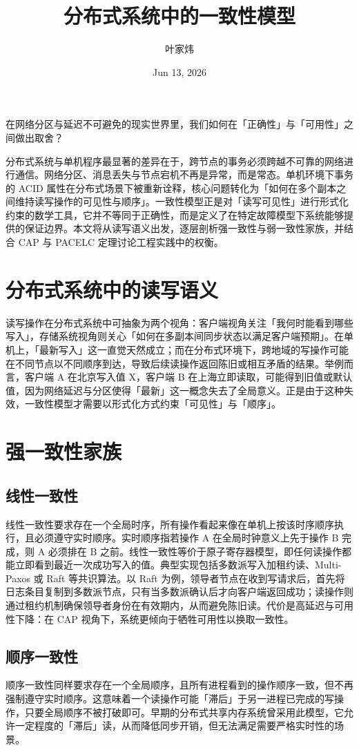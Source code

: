 \title{分布式系统中的一致性模型}
\author{叶家炜}
\date{Jun 13, 2026}
\maketitle
在网络分区与延迟不可避免的现实世界里，我们如何在「正确性」与「可用性」之间做出取舍？\par
分布式系统与单机程序最显著的差异在于，跨节点的事务必须跨越不可靠的网络进行通信。网络分区、消息丢失与节点宕机不再是异常，而是常态。单机环境下事务的 ACID 属性在分布式场景下被重新诠释，核心问题转化为「如何在多个副本之间维持读写操作的可见性与顺序」。一致性模型正是对「读写可见性」进行形式化约束的数学工具，它并不等同于正确性，而是定义了在特定故障模型下系统能够提供的保证边界。本文将从读写语义出发，逐层剖析强一致性与弱一致性家族，并结合 CAP 与 PACELC 定理讨论工程实践中的权衡。\par
\chapter{分布式系统中的读写语义}
读写操作在分布式系统中可抽象为两个视角：客户端视角关注「我何时能看到哪些写入」，存储系统视角则关心「如何在多副本间同步状态以满足客户端预期」。在单机上，「最新写入」这一直觉天然成立；而在分布式环境下，跨地域的写操作可能在不同节点以不同顺序到达，导致后续读操作返回陈旧或相互矛盾的结果。举例而言，客户端 A 在北京写入值 X，客户端 B 在上海立即读取，可能得到旧值或默认值，因为网络延迟与分区使得「最新」这一概念失去了全局意义。正是由于这种失效，一致性模型才需要以形式化方式约束「可见性」与「顺序」。\par
\chapter{强一致性家族}
\section{线性一致性}
线性一致性要求存在一个全局时序，所有操作看起来像在单机上按该时序顺序执行，且必须遵守实时顺序。实时顺序指若操作 A 在全局时钟意义上先于操作 B 完成，则 A 必须排在 B 之前。线性一致性等价于原子寄存器模型，即任何读操作都能立即看到最近一次成功写入的值。典型实现包括多数派写入加租约读、Multi-Paxos 或 Raft 等共识算法。以 Raft 为例，领导者节点在收到写请求后，首先将日志条目复制到多数派节点，只有当多数派确认后才向客户端返回成功；读操作则通过租约机制确保领导者身份在有效期内，从而避免陈旧读。代价是高延迟与可用性下降：在 CAP 视角下，系统更倾向于牺牲可用性以换取一致性。\par
\section{顺序一致性}
顺序一致性同样要求存在一个全局顺序，且所有进程看到的操作顺序一致，但不再强制遵守实时顺序。这意味着一个读操作可能「滞后」于另一进程已完成的写操作，只要全局顺序不被打破即可。早期的分布式共享内存系统曾采用此模型，它允许一定程度的「滞后」读，从而降低同步开销，但无法满足需要严格实时性的场景。\par
